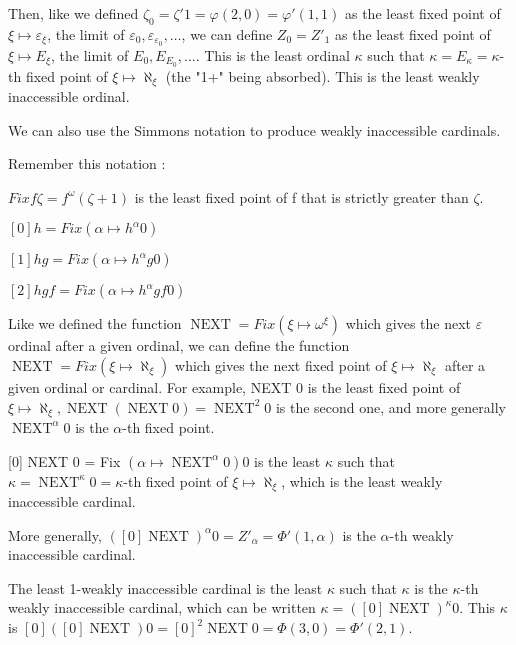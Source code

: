 \documentclass[10pt]{article}
\begin{document}
Then, like we defined \( \zeta_0 = \zeta'1 = \varphi(2,0) = \varphi'(1,1) \) as the least fixed point of \( \xi \mapsto \varepsilon_\xi \), the limit of \( \varepsilon_0, \varepsilon_{\varepsilon_0}, \ldots \), we can define \( Z_0 = Z'_1 \) as the least fixed point of \( \xi \mapsto E_\xi \), the limit of \( E_0, E_{E_0}, \ldots \).
This is the least ordinal \( \kappa \) such that \( \kappa = E_\kappa = \kappa\)-th fixed point of \( \xi \mapsto \aleph_\xi \) (the "1+" being absorbed). This is the least weakly inaccessible ordinal.

\bigskip

We can also use the Simmons notation to produce weakly inaccessible cardinals.

Remember this notation : 

\( Fix f \zeta = f^\omega (\zeta+1) \) is the least fixed point of f that is strictly greater than \( \zeta \).

\( [0] h = Fix (\alpha \mapsto h^\alpha 0) \)

\( [1] h g = Fix (\alpha \mapsto h^\alpha g 0)  \)

\( [2] h g f = Fix (\alpha \mapsto h^\alpha g f 0) \)

Like we defined the function \( \operatorname{NEXT} = Fix (\xi \mapsto \omega^\xi)\) which gives the next \( \varepsilon \) ordinal after a given ordinal, we can define the function \( \operatorname{NEXT} = Fix (\xi \mapsto \aleph_\xi) \) which gives the next fixed point of \( \xi \mapsto \aleph_\xi \) after a given ordinal or cardinal. For example, NEXT 0 is the least fixed point of \( \xi \mapsto \aleph_\xi, \operatorname{NEXT} (\operatorname{NEXT} 0) = \operatorname{NEXT}^2 0 \) is the second one, and more generally \( \operatorname{NEXT}^\alpha 0\) is the \(\alpha\)-th fixed point.

[0] NEXT 0 = Fix \( (\alpha \mapsto \operatorname{NEXT}^\alpha 0) 0 \) is the least \( \kappa \) such that \( \kappa = \operatorname{NEXT}^\kappa 0 = \kappa\)-th fixed point of \( \xi \mapsto \aleph_\xi \), which is the least weakly inaccessible cardinal.

More generally, \( ([0] \operatorname{NEXT})^\alpha 0 = Z'_\alpha = \Phi'(1,\alpha) \) is the \(\alpha\)-th weakly inaccessible cardinal.

The least 1-weakly inaccessible cardinal is the least \( \kappa \) such that \( \kappa \) is the \(\kappa\)-th weakly inaccessible cardinal, which can be written \( \kappa = ([0] \operatorname{NEXT})^\kappa 0 \). This \( \kappa \) is \( [0] ([0] \operatorname{NEXT}) 0 = [0]^2 \operatorname{NEXT} 0 = \Phi(3,0) = \Phi'(2,1) \).
\end{document}
